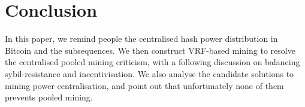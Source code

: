 \section{Conclusion}

In this paper, we remind people the centralised hash power distribution in Bitcoin and the subsequences.
We then construct VRF-based mining to resolve the centralised pooled mining criticism,
with a following discussion on balancing sybil-resistance and incentivisation.
We also analyse the candidate solutions to mining power centralisation, and point out that unfortunately none of them prevents pooled mining.